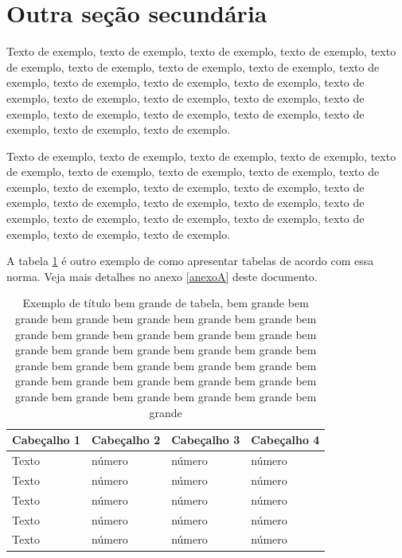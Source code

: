 \documentclass[
	12pt,				%
	oneside,			%
	a4paper,			%
	english,			%
	brazil				%
	]{abntex2ppgsi}
\begin{document}
\section{Outra seção secundária}

Texto de exemplo, texto de exemplo, texto de exemplo, texto de exemplo, texto de exemplo, texto de exemplo, texto de exemplo, texto de exemplo, texto de exemplo, texto de exemplo, texto de exemplo, texto de exemplo, texto de exemplo, texto de exemplo, texto de exemplo, texto de exemplo, texto de exemplo, texto de exemplo, texto de exemplo, texto de exemplo, texto de exemplo, texto de exemplo, texto de exemplo.

Texto de exemplo, texto de exemplo, texto de exemplo, texto de exemplo, texto de exemplo, texto de exemplo, texto de exemplo, texto de exemplo, texto de exemplo, texto de exemplo, texto de exemplo, texto de exemplo, texto de exemplo, texto de exemplo, texto de exemplo, texto de exemplo, texto de exemplo, texto de exemplo, texto de exemplo, texto de exemplo, texto de exemplo, texto de exemplo, texto de exemplo.

A tabela \ref{tab:ExemploDeTabela4} é outro exemplo de como apresentar tabelas de acordo com essa norma. Veja mais detalhes no anexo \ref{anexoA} deste documento.

\begin{table}[htbp]
	\centering
	\caption{Exemplo de título bem grande de tabela, bem grande bem grande bem grande bem grande bem grande bem grande bem grande bem grande bem grande bem grande bem grande bem grande bem grande bem grande bem grande bem grande bem grande bem grande bem grande bem grande bem grande bem grande bem grande bem grande bem grande bem grande bem grande bem grande bem grande bem grande bem grande bem grande}
		\begin{tabular}{p{1.4in} p{1.4in} p{1.4in} p{1.4in} } \hline
		
		Cabeçalho 1	& Cabeçalho 2	& Cabeçalho 3	& Cabeçalho 4 \\ \hline
		Texto	& número & número	& número \\ 
		Texto	& número & número	& número \\ 
		Texto	& número & número	& número \\ 
		Texto	& número & número	& número \\ 
		Texto	& número & número	& número \\ \hline
			
		\end{tabular}
	\label{tab:ExemploDeTabela4}
\end{table}
\end{document}

